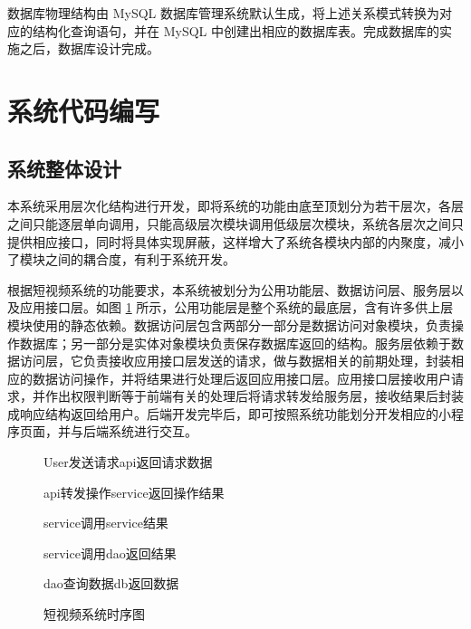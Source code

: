 数据库物理结构由 MySQL 数据库管理系统默认生成，将上述关系模式转换为对应的结构化查询语句，并在 MySQL 中创建出相应的数据库表。完成数据库的实施之后，数据库设计完成。



\section{系统代码编写}

\subsection{系统整体设计}
本系统采用层次化结构进行开发，即将系统的功能由底至顶划分为若干层次，各层之间只能逐层单向调用，只能高级层次模块调用低级层次模块，系统各层次之间只提供相应接口，同时将具体实现屏蔽，这样增大了系统各模块内部的内聚度，减小了模块之间的耦合度，有利于系统开发。

根据短视频系统的功能要求，本系统被划分为公用功能层、数据访问层、服务层以及应用接口层。如图 \ref{figs:soft1} 所示，公用功能层是整个系统的最底层，含有许多供上层模块使用的静态依赖。数据访问层包含两部分一部分是数据访问对象模块，负责操作数据库；另一部分是实体对象模块负责保存数据库返回的结构。服务层依赖于数据访问层，它负责接收应用接口层发送的请求，做与数据相关的前期处理，封装相应的数据访问操作，并将结果进行处理后返回应用接口层。应用接口层接收用户请求，并作出权限判断等于前端有关的处理后将请求转发给服务层，接收结果后封装成响应结构返回给用户。后端开发完毕后，即可按照系统功能划分开发相应的小程序页面，并与后端系统进行交互。

\begin{figure}[!ht]
    \centering
    \begin {sequencediagram}

\begin{call}{User}{发送请求}{api}{返回请求数据}
    \begin{call}{api}{转发操作}{service}{返回操作结果}
        \begin{call}{service}{调用}{service}{结果}
        \end{call}
        \begin{call}{service}{调用}{dao}{返回结果}
            \begin{call}{dao}{查询数据}{db}{返回数据}
            \end{call}
        \end{call}
    \end{call}
\end{call}

\end{sequencediagram}
    \caption{短视频系统时序图}
    \label{figs:soft1}
\end{figure}

